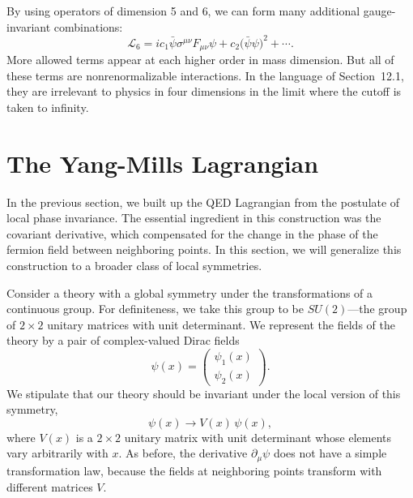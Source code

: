 By using operators of dimension 5 and 6, we can form many additional
gauge-invariant combinations:
\begin{equation}
  \mathcal{L}_6 = i c_1\bar{\psi}\sigma^{\mu\nu}F_{\mu\nu}\psi
    + c_2\bigl( \bar{\psi}\psi \bigr)^2 + \cdots .
  \label{eq:15.18}
\end{equation}
More allowed terms appear at each higher order in mass dimension.  But all of
these terms are nonrenormalizable interactions.  In the language of
Section~12.1, they are irrelevant to physics in four dimensions in the limit
where the cutoff is taken to infinity.

\section{The Yang-Mills Lagrangian}

In the previous section, we built up the QED Lagrangian from the postulate of
local phase invariance.  The essential ingredient in this construction was
the covariant derivative, which compensated for the change in the phase of the
fermion field between neighboring points.  In this section, we will generalize
this construction to a broader class of local symmetries.

Consider a theory with a global symmetry under the transformations of a
continuous group.  For definiteness, we take this group to be $SU(2)$---the
group of $2\times2$ unitary matrices with unit determinant.  We represent the
fields of the theory by a pair of complex-valued Dirac fields
\begin{equation}
  \psi(x) = \begin{pmatrix}\psi_1(x)\\ \psi_2(x)\end{pmatrix} .
\end{equation}
We stipulate that our theory should be invariant under the local version of
this symmetry,
\begin{equation}
  \psi(x) \to V(x)\,\psi(x) ,
  \label{eq:15.20}
\end{equation}
where $V(x)$ is a $2\times2$ unitary matrix with unit determinant whose
elements vary arbitrarily with $x$.  As before, the derivative $\partial_\mu\psi$
does not have a simple transformation law, because the fields at neighboring
points transform with different matrices $V$.

